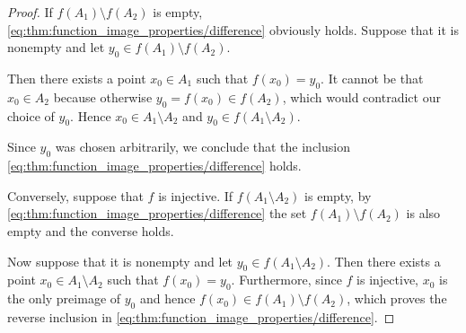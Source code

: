 \begin{proof}
   If \( f(A_1) \setminus f(A_2) \) is empty, \eqref{eq:thm:function_image_properties/difference} obviously holds. Suppose that it is nonempty and let \( y_0 \in f(A_1) \setminus f(A_2) \).

  Then there exists a point \( x_0 \in A_1 \) such that \( f(x_0) = y_0 \). It cannot be that \( x_0 \in A_2 \) because otherwise \( y_0 = f(x_0) \in f(A_2) \), which would contradict our choice of \( y_0 \). Hence \( x_0 \in A_1 \setminus A_2 \) and \( y_0 \in f(A_1 \setminus A_2) \).

  Since \( y_0 \) was chosen arbitrarily, we conclude that the inclusion \eqref{eq:thm:function_image_properties/difference} holds.

  Conversely, suppose that \( f \) is injective. If \( f(A_1 \setminus A_2) \) is empty, by \eqref{eq:thm:function_image_properties/difference} the set \( f(A_1) \setminus f(A_2) \) is also empty and the converse holds.

  Now suppose that it is nonempty and let \( y_0 \in f(A_1 \setminus A_2) \). Then there exists a point \( x_0 \in A_1 \setminus A_2 \) such that \( f(x_0) = y_0 \). Furthermore, since \( f \) is injective, \( x_0 \) is the only preimage of \( y_0 \) and hence \( f(x_0) \in f(A_1) \setminus f(A_2) \), which proves the reverse inclusion in \eqref{eq:thm:function_image_properties/difference}.
\end{proof}

